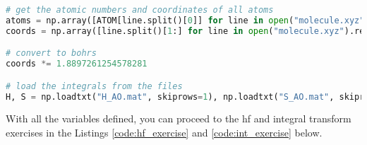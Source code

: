 \raggedbottom\begin{lstlisting}[language=Python, caption={Example loading of molecule and integrals over atomic basis functions into variables used throughout exercises. The snippet expects the molecule and integral files to b present in the same directory as the script.}, label=code:load_exercise]
# get the atomic numbers and coordinates of all atoms
atoms = np.array([ATOM[line.split()[0]] for line in open("molecule.xyz").readlines()[2:]], dtype=int)
coords = np.array([line.split()[1:] for line in open("molecule.xyz").readlines()[2:]], dtype=float)

# convert to bohrs
coords *= 1.8897261254578281

# load the integrals from the files
H, S = np.loadtxt("H_AO.mat", skiprows=1), np.loadtxt("S_AO.mat", skiprows=1); J = np.loadtxt("J_AO.mat", skiprows=1).reshape(4 * [S.shape[1]])
\end{lstlisting}

With all the variables defined, you can proceed to the \acrshort{hf} and integral transform exercises in the Listings \ref{code:hf_exercise} and \ref{code:int_exercise} below.


